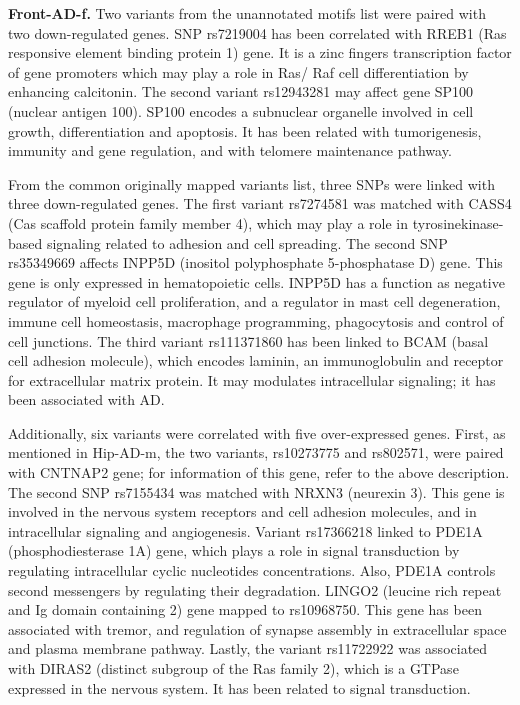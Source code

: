 \textbf{Front-AD-f.} Two variants from the unannotated motifs list were paired with two down-regulated genes. SNP rs7219004 has been correlated with RREB1 (Ras responsive element binding protein 1) gene. It is a zinc fingers transcription factor of gene promoters which may play a role in Ras/ Raf cell differentiation by enhancing calcitonin. The second variant rs12943281 may affect gene SP100 (nuclear antigen 100). SP100 encodes a subnuclear organelle involved in cell growth, differentiation and apoptosis. It has been related with tumorigenesis, immunity and gene regulation, and with telomere maintenance pathway.

From the common originally mapped variants list, three SNPs were linked with three down-regulated genes. The first variant rs7274581 was matched with CASS4 (Cas scaffold protein family member 4), which may play a role in tyrosinekinase-based signaling related to adhesion and cell spreading. The second SNP rs35349669 affects INPP5D (inositol polyphosphate 5-phosphatase D) gene. This gene is only expressed in hematopoietic cells. INPP5D has a function as negative regulator of myeloid cell proliferation, and a regulator in mast cell degeneration, immune cell homeostasis, macrophage programming, phagocytosis and control of cell junctions. The third variant rs111371860 has been linked to BCAM (basal cell adhesion molecule), which encodes laminin, an immunoglobulin and receptor for extracellular matrix protein. It may modulates intracellular signaling; it has been associated with AD.

Additionally, six variants were correlated with five over-expressed genes. First, as mentioned in Hip-AD-m, the two variants, rs10273775 and rs802571, were paired with CNTNAP2 gene; for information of this gene, refer to the above description. The second SNP rs7155434 was matched with NRXN3 (neurexin 3). This gene is involved in the nervous system receptors and cell adhesion molecules, and in intracellular signaling and angiogenesis. Variant rs17366218 linked to PDE1A (phosphodiesterase 1A) gene, which plays a role in signal transduction by regulating intracellular cyclic nucleotides concentrations. Also, PDE1A controls second messengers by regulating their degradation. LINGO2 (leucine rich repeat and Ig domain containing 2) gene mapped to rs10968750. This gene has been associated with tremor, and regulation of synapse assembly in extracellular space and plasma membrane pathway. Lastly, the variant rs11722922 was associated with DIRAS2 (distinct subgroup of the Ras family 2), which is a GTPase expressed in the nervous system. It has been related to signal transduction.

